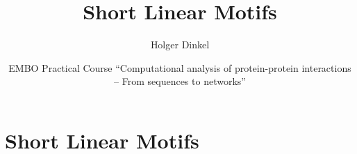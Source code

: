 \documentclass{beamer}
\newcommand{\includeoptional}{true}
\begin{document}
\date{EMBO Practical Course ``Computational analysis of protein-protein interactions -- From sequences to networks''}
\title{Short Linear Motifs}
\subtitle{}
\author{Holger Dinkel}

\newcommand{\optional}[1]{\ifthenelse{\equal{\includeoptional}{true}}{#1}{---}}
%
{
\begin{frame}[plain]
\note{}
    \titlepage
\end{frame}
%
}

\section{Short Linear Motifs}
\end{document}
